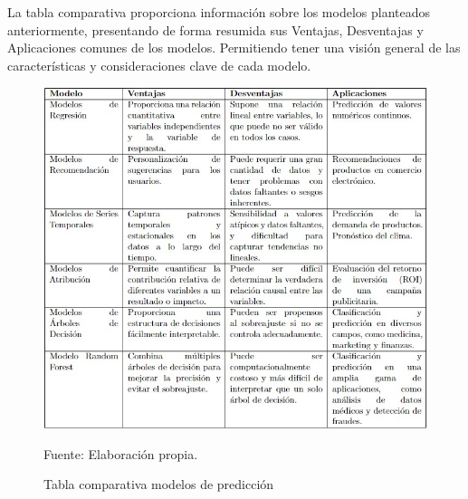 La tabla comparativa proporciona información sobre los modelos planteados anteriormente, presentando de forma resumida sus Ventajas, Desventajas y Aplicaciones comunes de los modelos. Permitiendo tener una visión general de las características y consideraciones clave de cada modelo.

\begin{figure}[H]
    \begin{minipage}[t]{0.9\textwidth}
        \caption{Tabla comparativa modelos de predicción}
        \label{tabla_comparativa}        
    \end{minipage}

    \vspace{10pt}

    \begin{minipage}[b]{0.99\textwidth}
        \centering
        \includegraphics[width=\textwidth]{img/tabla comparativa modelos.jpg}        
    \end{minipage}

    \begin{minipage}[t]{0.9\textwidth}
        Fuente: Elaboración propia.
    \end{minipage}
\end{figure}

